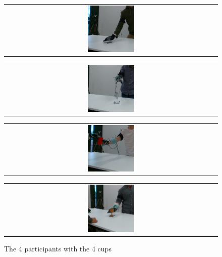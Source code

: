     \begin{figure}
        \centering
        \begin{tabular}{@{}c@{}}
            \centering
            \includegraphics[width=0.225\textwidth,height=0.15\textheight]{Images/frame000023.png}
        \end{tabular}
        \begin{tabular}{@{}c@{}}
            \centering 
            \includegraphics[width=0.225\textwidth,height=0.15\textheight]{Images/frame000046.png}
        \end{tabular}
        \baselineskip
        \begin{tabular}{@{}c@{}}
            \centering 
            \includegraphics[width=0.225\textwidth,height=0.15\textheight]{Images/frame000117.png}
        \end{tabular}
        \begin{tabular}{@{}c@{}}
            \centering 
            \includegraphics[width=0.225\textwidth,height=0.15\textheight]{Images/frame000144.png}
        \end{tabular}
        \caption{The 4 participants with the 4 cups}
        \label{fig:epfl_dataset}
    \end{figure}
    
